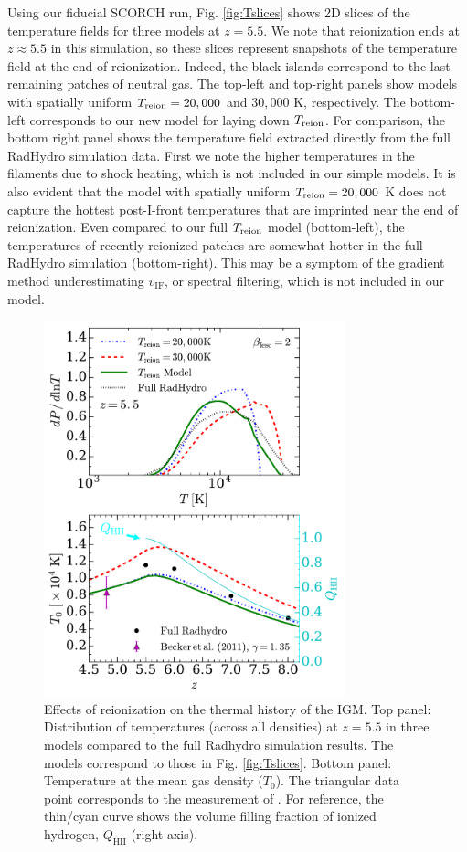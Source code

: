 \documentclass[twocolumn]{aastex62}
\newcommand{\Treion}{T_{\rm reion}}
\newcommand{\vIF}{v_{\mathrm{IF}}}
\begin{document}
Using our fiducial SCORCH run, Fig. \ref{fig:Tslices} shows 2D slices of the temperature fields for three models at $z=5.5$.  We note that reionization ends at $z\approx 5.5$ in this simulation, so these slices represent snapshots of the temperature field at the end of reionization.  Indeed, the black islands correspond to the last remaining patches of neutral gas. The top-left and top-right panels show models with spatially uniform $\Treion = 20,000$ and $30,000$ K, respectively.  The bottom-left corresponds to our new model for laying down $\Treion$.  For comparison, the bottom right panel shows the temperature field extracted directly from the full RadHydro simulation data.  First we note the higher temperatures in the filaments due to shock heating, which is not included in our simple models.  It is also evident that the model with spatially uniform $\Treion=20,000$ K does not capture the hottest post-I-front temperatures that are imprinted near the end of reionization.  Even compared to our full $\Treion$ model (bottom-left), the temperatures of recently reionized patches are somewhat hotter in the full RadHydro simulation (bottom-right).  This may be a symptom of the gradient method underestimating $\vIF$, or spectral filtering, which is not included in our model. 

\begin{figure}
\includegraphics[width=8.7cm]{fig10.pdf}
\caption{Effects of reionization on the thermal history of the IGM. Top panel: Distribution of temperatures (across all densities) at $z=5.5$ in three models compared to the full Radhydro simulation results.  The models correspond to those in Fig. \ref{fig:Tslices}. Bottom panel: Temperature at the mean gas density ($T_0$).   The triangular data point corresponds to the measurement of \citet{2011MNRAS.410.1096B}.  For reference, the thin/cyan curve shows the volume filling fraction of ionized hydrogen, $Q_{\mathrm{HII}}$ (right axis).}
\label{fig:dP_dT}
\end{figure}
\end{document}
